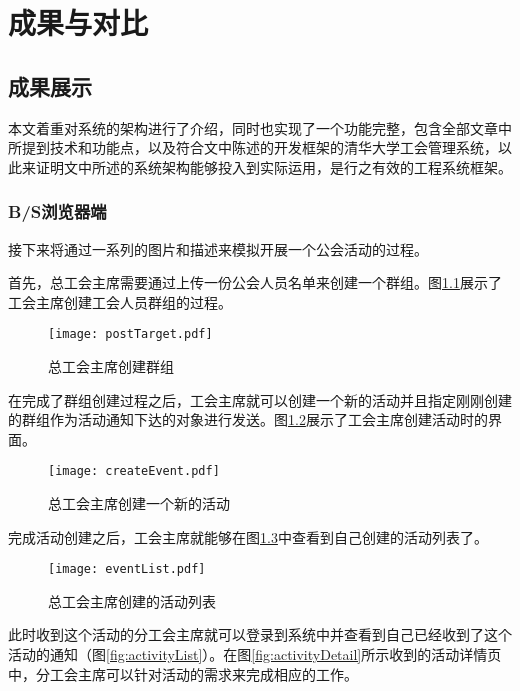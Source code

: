 
\chapter{成果与对比}

\section{成果展示}

本文着重对系统的架构进行了介绍，同时也实现了一个功能完整，包含全部文章中所提到技术和功能点，以及符合文中陈述的开发框架的清华大学工会管理系统，以此来证明文中所述的系统架构能够投入到实际运用，是行之有效的工程系统框架。

\subsection{B/S浏览器端}

接下来将通过一系列的图片和描述来模拟开展一个公会活动的过程。

首先，总工会主席需要通过上传一份公会人员名单来创建一个群组。图\ref{fig:postTarget}展示了工会主席创建工会人员群组的过程。

\begin{figure}[H]
  \centering
  \texttt{[image: postTarget.pdf]}
  \caption{总工会主席创建群组}
  \label{fig:postTarget}
\end{figure}

在完成了群组创建过程之后，工会主席就可以创建一个新的活动并且指定刚刚创建的群组作为活动通知下达的对象进行发送。图\ref{fig:createEvent}展示了工会主席创建活动时的界面。

\begin{figure}[H]
  \centering
  \texttt{[image: createEvent.pdf]}
  \caption{总工会主席创建一个新的活动}
  \label{fig:createEvent}
\end{figure}

完成活动创建之后，工会主席就能够在图\ref{fig:eventList}中查看到自己创建的活动列表了。

\begin{figure}[H]
  \centering
  \texttt{[image: eventList.pdf]}
  \caption{总工会主席创建的活动列表}
  \label{fig:eventList}
\end{figure}

此时收到这个活动的分工会主席就可以登录到系统中并查看到自己已经收到了这个活动的通知（图\ref{fig:activityList}）。在图\ref{fig:activityDetail}所示收到的活动详情页中，分工会主席可以针对活动的需求来完成相应的工作。

